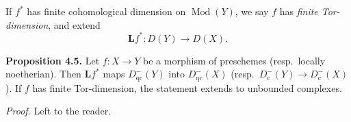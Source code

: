 If $f^*$ has finite cohomological dimension on $\operatorname{Mod}(Y)$, we say $f$ has \textit{finite Tor-dimension}, and extend
\[
\mathbf{L}f^*\colon D(Y)\to D(X).
\]

\textbf{Proposition 4.5.}
Let $f\colon X\to Y$ be a morphism of preschemes (resp.\ locally noetherian).
Then $\mathbf{L}f^*$ maps $D_\mathrm{qc}^-(Y)$ into $D_\mathrm{qc}^-(X)$ (resp.\ $D_\mathrm{c}^-(Y)\to D_\mathrm{c}^-(X)$).
If $f$ has finite Tor-dimension, the statement extends to unbounded complexes.

\textit{Proof.} Left to the reader.